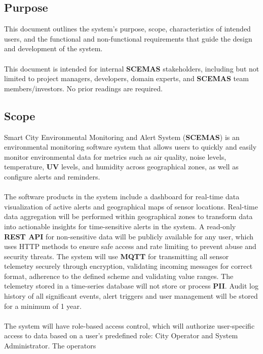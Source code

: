 \documentclass[]{article}
\begin{document}
\subsection{Purpose}
\label{sub:purpose}
This document outlines the system’s purpose, scope, characteristics of intended users, and the 
functional and non-functional requirements that guide the design and development of the system.
\\\\This document is intended for internal \textbf{SCEMAS} stakeholders, including but not limited to project managers, developers, domain experts, and \textbf{SCEMAS} team members/investors. No prior readings are required.

\subsection{Scope}
\label{sub:scope}
Smart City Environmental Monitoring and Alert System (\textbf{SCEMAS}) is an environmental monitoring 
software system that allows users to quickly and easily monitor environmental data for metrics 
such as air quality, noise levels, temperature, \textbf{UV} levels, and humidity across geographical 
zones, as well as configure alerts and reminders.\\\\
The software products in the system include a dashboard for real-time data visualization of 
active alerts and geographical maps of sensor locations. Real-time data aggregation will be 
performed within geographical zones to transform data into actionable insights for time-sensitive 
alerts in the system. A read-only \textbf{REST API} for non-sensitive data will be publicly available 
for any user, which uses HTTP methods to ensure safe access and rate limiting to prevent abuse 
and security threats. The system will use \textbf{MQTT} for transmitting all sensor telemetry securely 
through encryption, validating incoming messages for correct format, adherence to the defined 
scheme and validating value ranges. The telemetry stored in a time-series database will not 
store or process \textbf{PII}. Audit log history of all significant events, alert triggers and user 
management will be stored for a minimum of 1 year.\\\\
The system will have role-based access control, which will authorize user-specific access to 
data based on a user’s predefined role: City Operator and System Administrator. The operators 
\end{document}
